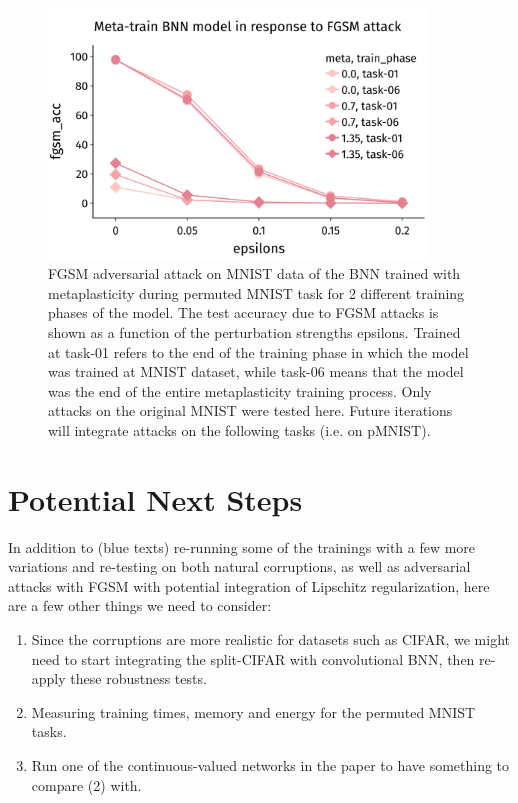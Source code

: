 \documentclass[manuscript,screen,review]{acmart}
\begin{document}
\begin{figure}
    \centering
    \includegraphics[width=0.9\textwidth]{figures/report/Fig4.png}
    \caption{FGSM adversarial attack on MNIST data of the BNN trained with metaplasticity during permuted MNIST task for 2 different training phases of the model. The test accuracy due to FGSM attacks is shown as a function of the perturbation strengths epsilons. Trained at task-01 refers to the end of the training phase in which the model was trained at MNIST dataset, while task-06 means that the model was the end of the entire metaplasticity training process. Only attacks on the original MNIST were tested here. Future iterations will integrate attacks on the following tasks (i.e. on pMNIST). }
    \label{fig:fig4}
\end{figure}

\section{Potential Next Steps}

In addition to (blue texts) re-running some of the trainings with a few more variations and re-testing on both natural corruptions, as well as adversarial attacks with FGSM with potential integration of Lipschitz regularization, here are a few other things we need to consider:
\begin{enumerate}
    \item Since the corruptions are more realistic for datasets such as CIFAR, we might need to start integrating the split-CIFAR with convolutional BNN, then re-apply these robustness tests.
    \item Measuring training times, memory and energy for the permuted MNIST tasks.
    \item Run one of the continuous-valued networks in the paper to have something to compare (2) with.
\end{enumerate}
\end{document}
